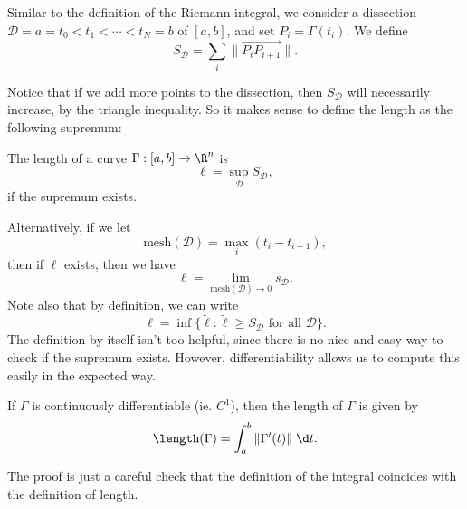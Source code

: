 \documentclass[a4paper]{article}
\begin{document}
Similar to the definition of the Riemann integral, we consider a dissection $\mathcal{D} = a = t_0 < t_1 < \cdots < t_N = b$ of $[a, b]$, and set $P_i = \Gamma(t_i)$. We define
\[
  S_\mathcal{D} = \sum_i \|\overrightarrow{P_i P_{i + 1}}\|.
\]
\begin{center}
\end{center}
Notice that if we add more points to the dissection, then $S_\mathcal{D}$ will necessarily increase, by the triangle inequality. So it makes sense to define the length as the following supremum:
\begin{defi}
  The length of a curve $\Gamma: [a, b] \to \R^n$ is
  \[
    \ell = \sup_{\mathcal{D}} S_{\mathcal{D}},
  \]
  if the supremum exists.
\end{defi}
Alternatively, if we let
\[
  \mathrm{mesh}(\mathcal{D})= \max_i (t_i - t_{i - 1}),
\]
then if $\ell$ exists, then we have
\[
  \ell = \lim_{\mathrm{mesh}(\mathcal{D}) \to 0} s_{\mathcal{D}}.
\]
Note also that by definition, we can write
\[
  \ell = \inf\{\tilde{\ell}: \tilde{\ell} \geq S_{\mathcal{D}}\text{ for all }\mathcal{D}\}.
\]
The definition by itself isn't too helpful, since there is no nice and easy way to check if the supremum exists. However, differentiability allows us to compute this easily in the expected way.
\begin{prop}
  If $\Gamma$ is continuously differentiable (ie. $C^1$), then the length of $\Gamma$ is given by
  \[
    \length(\Gamma) = \int_a^b \|\Gamma'(t)\|\;\d t.
  \]
\end{prop}
The proof is just a careful check that the definition of the integral coincides with the definition of length.
\end{document}
